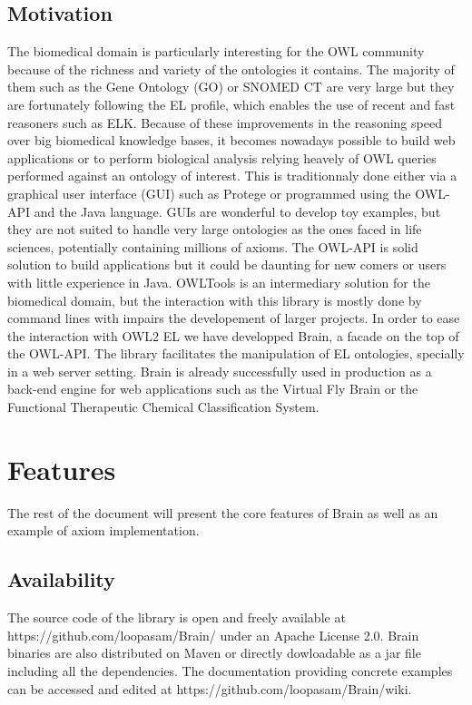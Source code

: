 \documentclass{llncs}
\begin{document}
\subsection{Motivation}
The biomedical domain is particularly interesting for the OWL community because of the richness and variety of the ontologies it contains.
The majority of them such as the Gene Ontology (GO) or SNOMED CT are very large but they are fortunately following 
the EL profile, which enables the use of recent and fast reasoners such as ELK.
Because of these improvements in the reasoning speed over big biomedical knowledge bases, 
it becomes nowadays possible to build web applications or to perform biological analysis relying heavely of OWL queries performed against
an ontology of interest. This is traditionnaly done either via a graphical user interface (GUI) such as Protege or programmed
using the OWL-API and the Java language. GUIs are wonderful to develop toy examples, but they are not suited to handle very large 
ontologies as the ones faced in life sciences, potentially containing millions of axioms. The OWL-API is solid solution to build
applications but it could be daunting for new comers or users with little experience in Java. OWLTools is an intermediary solution for the
biomedical domain, but the interaction with this library is mostly done by command lines with impairs the developement of larger projects.
In order to ease the interaction with OWL2 EL we have developped Brain, a facade on the top of the OWL-API. The library facilitates the
manipulation of EL ontologies, specially in a web server setting. 
Brain is already successfully used in production as a back-end engine for web applications 
such as the Virtual Fly Brain or the Functional Therapeutic Chemical Classification System.

\section{Features}
The rest of the document will present the core features of Brain as well as an example of axiom implementation. 

\subsection{Availability}
The source code of the library is open and freely available at https://github.com/loopasam/Brain/ under an Apache License 2.0.
Brain binaries are also distributed on Maven or directly dowloadable as a jar file including all the dependencies.
The documentation providing concrete examples can be accessed and edited at https://github.com/loopasam/Brain/wiki.
\end{document}
